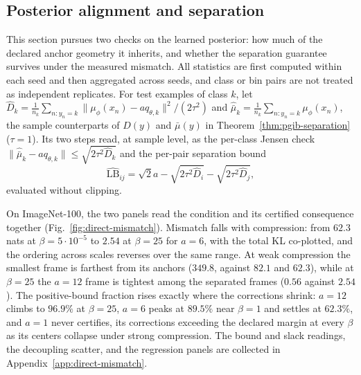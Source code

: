 \subsection{Posterior alignment and separation}
\label{sec:direct-mismatch}
This section pursues two checks on the learned posterior: how much of the declared
anchor geometry it inherits, and whether the separation guarantee survives under the
measured mismatch. All statistics are first computed within each seed and then
aggregated across seeds, and class or bin pairs are not treated as
independent replicates. For test examples of class $k$, let
$\widehat D_k=\frac1{n_k}\sum_{n:y_n=k}\|\mu_\phi(x_n)-a q_{\theta,k}\|^2/(2\tau^2)$
and $\widehat{\bar\mu}_k=\frac1{n_k}\sum_{n:y_n=k}\mu_\phi(x_n)$, the sample counterparts
of $D(y)$ and $\bar\mu(y)$ in Theorem~\ref{thm:pgib-separation}
($\tau=1$). Its two steps read, at sample level, as the per-class
Jensen check $\|\widehat{\bar\mu}_k-aq_{\theta,k}\|\le\sqrt{2\tau^2\widehat D_k}$ and the
per-pair separation bound
\begin{equation}
\widehat{\mathrm{LB}}_{ij}=\sqrt{2}a-\sqrt{2\tau^2\widehat D_i}-\sqrt{2\tau^2\widehat D_j},
\label{eq:empirical-class-separation-bound}
\end{equation}
evaluated without clipping.

On ImageNet-100, the two panels read the condition and its certified consequence
together (Fig.~\ref{fig:direct-mismatch}). Mismatch falls with compression: from
$62.3$ nats at $\beta=5\cdot10^{-5}$ to $2.54$ at $\beta=25$ for $a=6$, with the
total KL co-plotted, and the ordering across scales reverses over the same range. At
weak compression the smallest frame is farthest from its anchors ($349.8$, against
$82.1$ and $62.3$), while at $\beta=25$ the $a=12$ frame is tightest among the
separated frames ($0.56$ against $2.54$). The positive-bound fraction rises exactly where the
corrections shrink: $a=12$ climbs to $96.9\%$ at $\beta=25$, $a=6$ peaks at $89.5\%$
near $\beta=1$ and settles at $62.3\%$, and $a=1$ never certifies, its corrections
exceeding the declared margin at every $\beta$ as its centers collapse under strong
compression. The bound and slack readings, the decoupling scatter, and the
regression panels are collected in Appendix~\ref{app:direct-mismatch}.

